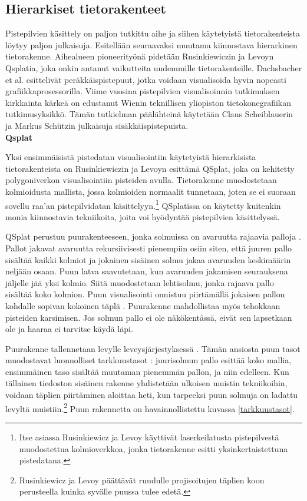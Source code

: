 \subsection{Hierarkiset tietorakenteet} \label{tietorakenteet}

Pistepilvien käsittely on paljon tutkittu aihe ja siihen käytetyistä tietorakenteista löytyy paljon julkaisuja. Esitellään seuraavaksi muutama kiinnostava hierarkinen tietorakenne. Aihealueen pioneerityönä pidetään Rusinkiewiczin ja Levoyn Qsplatia, joka onkin antanut vaikutteita uudemmille tietorakenteille. Dachsbacher et al. esittelivät peräkkäispistepuut, jotka voidaan visualisoida hyvin nopeasti grafiikkaprosessorilla. Viime vuosina pistepilvien visualisoinnin tutkimuksen kirkkainta kärkeä on edustanut Wienin teknillisen yliopiston tietokonegrafiikan tutkimusyksikkö. Tämän tutkielman päälähteinä käytetään Claus Scheiblauerin ja Markus Schützin julkaisuja sisäkkäispistepuista.\\

\noindent\large\textbf{Qsplat}
\normalsize

\noindent Yksi ensimmäisistä pistedatan visualisointiin käytetyistä hierarkisista tietorakenteista on Rusinkiewiczin ja Levoyn esittämä QSplat, joka on kehitetty polygoniverkon visualisointiin pisteiden avulla. Tietorakenne muodostetaan kolmioidusta mallista, jossa kolmioiden normaalit tunnetaan, joten se ei suoraan sovellu raa'an pistepilvidatan käsittelyyn.\footnote{Itse asiassa Rusinkiewicz ja Levoy käyttivät laserkeilatusta pistepilvestä muodostettua kolmioverkkoa, jonka tietorakenne esitti yksinkertaistettuna pistedatana.} QSplatissa on käytetty kuitenkin monia kiinnostavia tekniikoita, joita voi hyödyntää pistepilvien käsittelyssä. \cite{qsplat}

QSplat perustuu puurakenteeseen, jonka solmuissa on avaruutta rajaavia palloja . Pallot jakavat avaruutta rekursiivisesti pienempiin osiin siten, että juuren pallo sisältää kaikki kolmiot ja jokainen sisäinen solmu jakaa avaruuden keskimäärin neljään osaan. Puun latva saavutetaan, kun avaruuden jakamisen seurauksena jäljelle jää yksi kolmio. Siitä muodostetaan lehtisolmu, jonka rajaava pallo sisältää koko kolmion. Puun visualisointi onnistuu piirtämällä jokaisen pallon kohdalle sopivan kokoinen täplä . Puurakenne mahdollistaa myös tehokkaan pisteiden karsimisen. Jos solmun pallo ei ole näkökentässä, eivät sen lapsetkaan ole ja haaraa ei tarvitse käydä läpi. \cite{qsplat}

Puurakenne tallennetaan levylle leveysjärjestyksessä . Tämän ansiosta puun tasot muodostavat luonnolliset tarkkuustasot : juurisolmun pallo esittää koko mallia, ensimmäinen taso sisältää muutaman pienemmän pallon, ja niin edelleen. Kun tällainen tiedoston sisäinen rakenne yhdistetään ulkoisen muistin tekniikoihin, voidaan täplien piirtäminen aloittaa heti, kun tarpeeksi puun solmuja on ladattu levyltä muistiin.\footnote{Rusinkiewicz ja Levoy päättävät ruudulle projisoitujen täplien koon perusteella kuinka syvälle puussa tulee edetä.} Puun rakennetta on havainnollistettu kuvassa \ref{tarkkuustasot}. \cite{qsplat}

